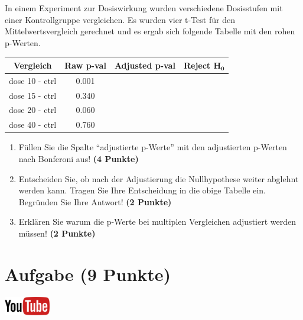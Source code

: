 \documentclass[a4paper, 10pt]{scrartcl}\usepackage[]{graphicx}\usepackage[]{xcolor}
\begin{document}
In einem Experiment zur Dosiswirkung wurden verschiedene Dosisstufen mit
einer Kontrollgruppe vergleichen. Es wurden vier t-Test f{\"u}r den
Mittelwertsvergleich gerechnet und es ergab sich folgende Tabelle mit den
rohen p-Werten.



\begin{center}
  \Large
  \begin{tabular}{c|c|c|c}
    \textbf{Vergleich} & \textbf{Raw p-val} & \textbf{Adjusted p-val} &
                                                                        \textbf{Reject $\boldsymbol{H_0}$} \strut\\
    \hline
    dose 10 - ctrl  & 0.001 &  &\strut\\
    \hline
    dose 15 - ctrl  & 0.340 & &\strut\\
    \hline
    dose 20 - ctrl  & 0.060 & &\strut\\
    \hline
    dose 40 - ctrl  & 0.760 & &\strut\\
  \end{tabular}
\end{center}

\begin{enumerate}
\item F{\"u}llen Sie die Spalte "`adjustierte p-Werte"' mit den adjustierten
  p-Werten nach Bonferoni aus! \textbf{(4 Punkte)}
\item Entscheiden Sie, ob nach der Adjustierung die Nullhypothese weiter
  abglehnt werden kann. Tragen Sie Ihre Entscheidung in die obige Tabelle
  ein. Begr{\"u}nden Sie Ihre Antwort! \textbf{(2 Punkte)}
\item Erkl{\"a}ren Sie warum die p-Werte bei multiplen Vergleichen
  adjustiert werden m{\"u}ssen! \textbf{(2 Punkte)}
\end{enumerate}

\vspace{1Ex}

 
\clearpage

\section{Aufgabe \hfill (9 Punkte)}

 \hfill\href{https://youtu.be/RagTFFKFbFg}{\includegraphics[width =
   2cm]{img/youtube}}\\[1Ex]
\end{document}
